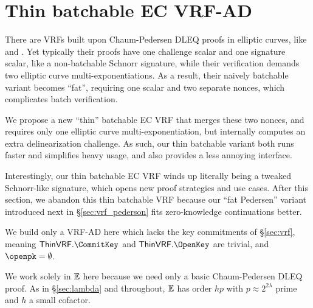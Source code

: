 
\section{Thin batchable EC VRF-AD}
\label{sec:vrf_thin}

There are VRFs built upon Chaum-Pedersen DLEQ proofs in elliptic curves,
 like \cite{nsec5} and \cite{VXEd25519}.
Yet typically their proofs have one challenge scalar and one signature
scalar, like a non-batchable Schnorr signature, while 
their verification demands two elliptic curve multi-exponentiations.
As a result, their naively batchable variant becomes ``fat'', requiring
one scalar and two separate nonces, which complicates batch verification.

We propose a new ``thin'' batchable EC VRF that merges these two nonces,
and requires only one elliptic curve multi-exponentiation, but
internally computes an extra delinearization challenge.
As such, our thin batchable variant both runs faster and simplifies heavy usage,
and also provides a less annoying interface.

Interestingly, our thin batchable EC VRF winds up literally being
a tweaked Schnorr-like signature, which opens new proof strategies and
use cases.  After this section, we abandon this thin batchable VRF
because our ``fat Pedersen'' variant introduced next in \S\ref{sec:vrf_pederson}
fits zero-knowledge continuations better.

\smallskip

\newcommand{\ThinVRF}{\primalgo{ThinVRF}} 


We build only a VRF-AD here which lacks the key commitments of \S\ref{sec:vrf},
meaning $\ThinVRF.\CommitKey$ and $\ThinVRF.\OpenKey$ are trivial, and $\openpk = \emptyset$.

We work solely in ${\mathbb{E}}$ here because we need only a basic Chaum-Pedersen DLEQ proof.
As in \S\ref{sec:lambda} and throughout,
 ${\mathbb{E}}$ has order $h p$ with $p \approx 2^{2\lambda}$ prime and $h$ a small cofactor.

